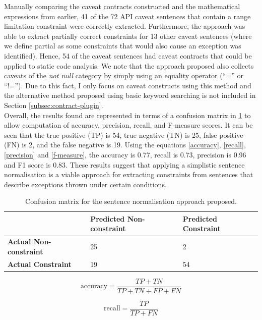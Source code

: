 Manually comparing the caveat contracts constructed and the mathematical expressions from earlier, 41 of the 72 API caveat sentences that contain a range limitation constraint were correctly extracted. Furthermore, the approach was able to extract partially correct constraints for 13 other caveat sentences (where we define partial as some constraints that would also cause an exception was identified). Hence, 54 of the caveat sentences had caveat contracts that could be applied to static code analysis. We note that the approach proposed also collects caveats of the \textit{not null} category by simply using an equality operator (``='' or ``!=''). Due to this fact, I only focus on caveat constructs using this method and the alternative method proposed using basic keyword searching is not included in Section \ref{subsec:contract-plugin}. \\
Overall, the results found are represented in terms of a confusion matrix in \ref{tab:conf-mat} to allow computation of accuracy, precision, recall, and F-measure scores. It can be seen that the true positive (TP) is 54, true negative (TN) is 25, false positive (FN) is 2, and the false negative is 19. Using the equations \ref{accuracy}, \ref{recall}, \ref{precision} and \ref{f-measure}, the accuracy is 0.77, recall is 0.73, precision is 0.96 and F1 score is 0.83. These results suggest that applying a simplistic sentence normalisation is a viable approach for extracting constraints from sentences that describe exceptions thrown under certain conditions. 

\begin{table}[h]
	\centering
	\begin{tabular}{l|l|l|}
		\cline{2-3}
		& \textbf{Predicted Non-constraint} & \textbf{Predicted Constraint} \\ \hline
		\multicolumn{1}{|l|}{\textbf{Actual Non-constraint}} & 25 & 2 \\ \hline
		\multicolumn{1}{|l|}{\textbf{Actual Constraint}} & 19 & 54 \\ \hline
	\end{tabular}
	\caption{Confusion matrix for the sentence normalisation approach proposed.}
	\label{tab:conf-mat}
\end{table}

\begin{equation}
\label{accuracy}
\text{accuracy} = \frac{TP + TN}{TP + TN + FP + FN}
\end{equation}

\begin{equation}
\label{recall}
\text{recall}=\frac{TP}{TP + FN}
\end{equation}

